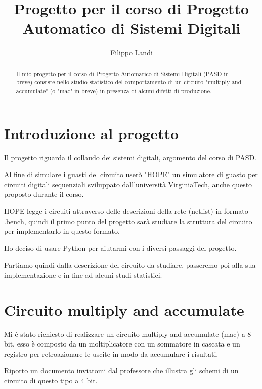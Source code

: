 \documentclass[12pt, letterpaper]{article}
\title{Progetto per il corso di Progetto Automatico di Sistemi Digitali}
\author{Filippo Landi}
\begin{document}
\maketitle

\begin{abstract}
Il mio progetto per il corso di Progetto Automatico di Sistemi Digitali (PASD in breve) consiste nello studio statistico del comportamento di un circuito "multiply and accumulate" (o "mac" in breve) in presenza di alcuni difetti di produzione.
\end{abstract}

\section{Introduzione al progetto}

Il progetto riguarda il collaudo dei sistemi digitali, argomento del corso di PASD.

Al fine di simulare i guasti del circuito userò "HOPE" un simulatore di guasto per circuiti digitali sequenziali sviluppato dall'università VirginiaTech, anche questo proposto durante il corso.  

HOPE legge i circuiti attraverso delle descrizioni della rete (netlist) in formato .bench, quindi il primo punto del progetto sarà studiare la struttura del circuito per implementarlo in questo formato.

Ho deciso di usare Python per aiutarmi con i diversi passaggi del progetto.

Partiamo quindi dalla descrizione del circuito da studiare, passeremo poi alla sua implementazione e in fine ad alcuni studi statistici.

\section{Circuito multiply and accumulate}

Mi è stato richiesto di realizzare un circuito multiply and accumulate (mac) a 8 bit, esso è composto da un moltiplicatore con un sommatore in cascata e un registro per retroazionare le uscite in modo da accumulare i risultati.

Riporto un documento inviatomi dal professore che illustra gli schemi di un circuito di questo tipo a 4 bit.
\end{document}
